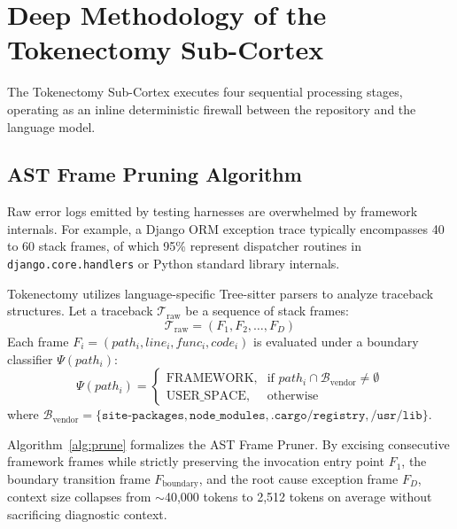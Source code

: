 \documentclass[10pt,twocolumn,letterpaper]{article}
\begin{document}
\section{Deep Methodology of the Tokenectomy Sub-Cortex}

The Tokenectomy Sub-Cortex executes four sequential processing stages, operating as an inline deterministic firewall between the repository and the language model.

\subsection{AST Frame Pruning Algorithm}
Raw error logs emitted by testing harnesses are overwhelmed by framework internals. For example, a Django ORM exception trace typically encompasses 40 to 60 stack frames, of which 95\% represent dispatcher routines in \texttt{django.core.handlers} or Python standard library internals.

Tokenectomy utilizes language-specific Tree-sitter parsers to analyze traceback structures. Let a traceback $\mathcal{T}_{\text{raw}}$ be a sequence of stack frames:
\begin{equation}
    \mathcal{T}_{\text{raw}} = (F_1, F_2, \dots, F_D)
\end{equation}
Each frame $F_i = (path_i, line_i, func_i, code_i)$ is evaluated under a boundary classifier $\Psi(path_i)$:
\begin{equation}
    \Psi(path_i) = \begin{cases}
    \text{FRAMEWORK}, & \text{if } path_i \cap \mathcal{B}_{\text{vendor}} \ne \emptyset \\
    \text{USER\_SPACE}, & \text{otherwise}
    \end{cases}
\end{equation}
where $\mathcal{B}_{\text{vendor}} = \{\texttt{site-packages}, \texttt{node\_modules}, \texttt{.cargo/registry}, \texttt{/usr/lib}\}$.

Algorithm~\ref{alg:prune} formalizes the AST Frame Pruner. By excising consecutive framework frames while strictly preserving the invocation entry point $F_1$, the boundary transition frame $F_{\text{boundary}}$, and the root cause exception frame $F_D$, context size collapses from $\sim$40,000 tokens to 2,512 tokens on average without sacrificing diagnostic context.
\end{document}
